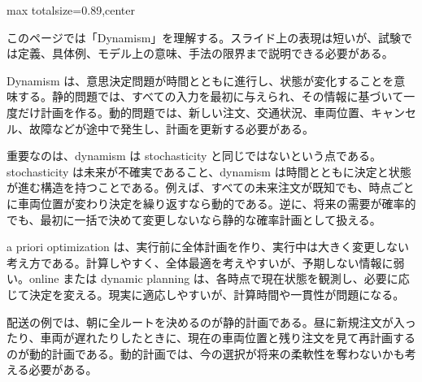 \begin{minipage}[t]{0.58\textwidth}
\begin{adjustbox}{max totalsize={\textwidth}{0.89\textheight},center}
\begin{minipage}{\textwidth}\scriptsize
{}このページでは「Dynamism」を理解する。スライド上の表現は短いが、試験では定義、具体例、モデル上の意味、手法の限界まで説明できる必要がある。\par
Dynamism は、意思決定問題が時間とともに進行し、状態が変化することを意味する。静的問題では、すべての入力を最初に与えられ、その情報に基づいて一度だけ計画を作る。動的問題では、新しい注文、交通状況、車両位置、キャンセル、故障などが途中で発生し、計画を更新する必要がある。\par
重要なのは、dynamism は stochasticity と同じではないという点である。stochasticity は未来が不確実であること、dynamism は時間とともに決定と状態が進む構造を持つことである。例えば、すべての未来注文が既知でも、時点ごとに車両位置が変わり決定を繰り返すなら動的である。逆に、将来の需要が確率的でも、最初に一括で決めて変更しないなら静的な確率計画として扱える。\par
a priori optimization は、実行前に全体計画を作り、実行中は大きく変更しない考え方である。計算しやすく、全体最適を考えやすいが、予期しない情報に弱い。online または dynamic planning は、各時点で現在状態を観測し、必要に応じて決定を変える。現実に適応しやすいが、計算時間や一貫性が問題になる。\par
配送の例では、朝に全ルートを決めるのが静的計画である。昼に新規注文が入ったり、車両が遅れたりしたときに、現在の車両位置と残り注文を見て再計画するのが動的計画である。動的計画では、今の選択が将来の柔軟性を奪わないかも考える必要がある。\par

\end{minipage}
\end{adjustbox}
\end{minipage}
